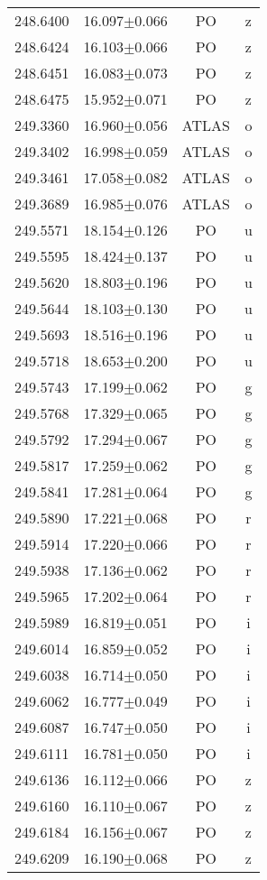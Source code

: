 \begin{table}
\begin{tabular}{cccc}
248.6400 & 16.097$\pm$0.066 & PO & z \\
248.6424 & 16.103$\pm$0.066 & PO & z \\
248.6451 & 16.083$\pm$0.073 & PO & z \\
248.6475 & 15.952$\pm$0.071 & PO & z \\
249.3360 & 16.960$\pm$0.056 & ATLAS & o \\
249.3402 & 16.998$\pm$0.059 & ATLAS & o \\
249.3461 & 17.058$\pm$0.082 & ATLAS & o \\
249.3689 & 16.985$\pm$0.076 & ATLAS & o \\
249.5571 & 18.154$\pm$0.126 & PO & u \\
249.5595 & 18.424$\pm$0.137 & PO & u \\
249.5620 & 18.803$\pm$0.196 & PO & u \\
249.5644 & 18.103$\pm$0.130 & PO & u \\
249.5693 & 18.516$\pm$0.196 & PO & u \\
249.5718 & 18.653$\pm$0.200 & PO & u \\
249.5743 & 17.199$\pm$0.062 & PO & g \\
249.5768 & 17.329$\pm$0.065 & PO & g \\
249.5792 & 17.294$\pm$0.067 & PO & g \\
249.5817 & 17.259$\pm$0.062 & PO & g \\
249.5841 & 17.281$\pm$0.064 & PO & g \\
249.5890 & 17.221$\pm$0.068 & PO & r \\
249.5914 & 17.220$\pm$0.066 & PO & r \\
249.5938 & 17.136$\pm$0.062 & PO & r \\
249.5965 & 17.202$\pm$0.064 & PO & r \\
249.5989 & 16.819$\pm$0.051 & PO & i \\
249.6014 & 16.859$\pm$0.052 & PO & i \\
249.6038 & 16.714$\pm$0.050 & PO & i \\
249.6062 & 16.777$\pm$0.049 & PO & i \\
249.6087 & 16.747$\pm$0.050 & PO & i \\
249.6111 & 16.781$\pm$0.050 & PO & i \\
249.6136 & 16.112$\pm$0.066 & PO & z \\
249.6160 & 16.110$\pm$0.067 & PO & z \\
249.6184 & 16.156$\pm$0.067 & PO & z \\
249.6209 & 16.190$\pm$0.068 & PO & z \\

\end{tabular}
\end{table}
